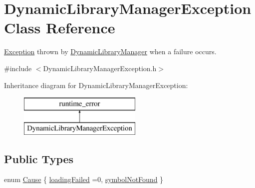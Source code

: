 \hypertarget{class_dynamic_library_manager_exception}{}\section{Dynamic\+Library\+Manager\+Exception Class Reference}
\label{class_dynamic_library_manager_exception}


\hyperlink{class_exception}{Exception} thrown by \hyperlink{class_dynamic_library_manager}{Dynamic\+Library\+Manager} when a failure occurs.  




{\ttfamily \#include $<$Dynamic\+Library\+Manager\+Exception.\+h$>$}

Inheritance diagram for Dynamic\+Library\+Manager\+Exception\+:\begin{figure}[H]
\begin{center}
\leavevmode
\includegraphics[height=2.000000cm]{class_dynamic_library_manager_exception}
\end{center}
\end{figure}
\subsection*{Public Types}
\begin{DoxyCompactItemize}
\item 
enum \hyperlink{class_dynamic_library_manager_exception_a73b4694c152e0693fbc19fb04987a0b9}{Cause} \{ \hyperlink{class_dynamic_library_manager_exception_a73b4694c152e0693fbc19fb04987a0b9a778b42fb996bf018bdc26934649cad63}{loading\+Failed} =0, 
\hyperlink{class_dynamic_library_manager_exception_a73b4694c152e0693fbc19fb04987a0b9a193fc58bb852e09790da269e2b613045}{symbol\+Not\+Found}
 \}
\end{DoxyCompactItemize}
